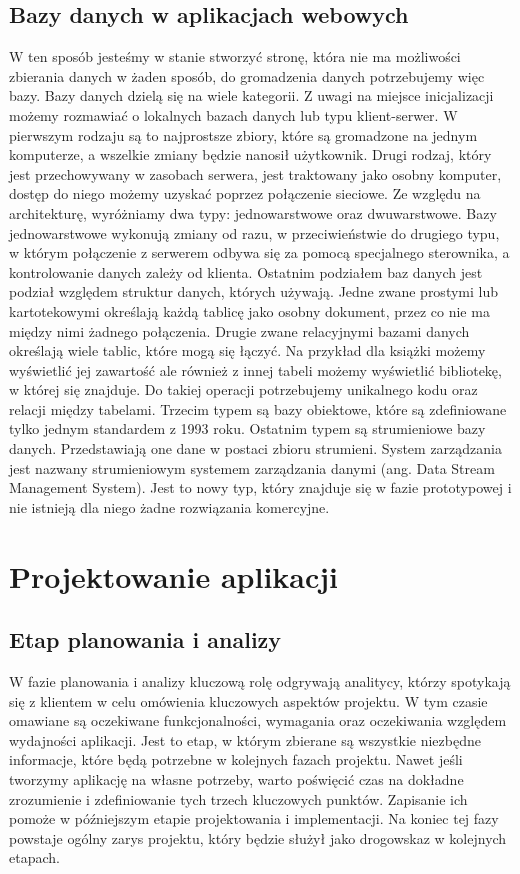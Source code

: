 \subsection{Bazy danych w aplikacjach webowych}

W ten sposób jesteśmy w stanie stworzyć stronę, która nie ma możliwości zbierania danych w żaden sposób, do gromadzenia danych potrzebujemy więc bazy. Bazy danych dzielą się na wiele kategorii. Z uwagi na miejsce inicjalizacji możemy rozmawiać o lokalnych bazach danych lub typu klient-serwer. W pierwszym rodzaju są to najprostsze zbiory, które są gromadzone na jednym komputerze, a wszelkie zmiany będzie nanosił użytkownik. Drugi rodzaj, który jest przechowywany w zasobach serwera, jest traktowany jako osobny komputer, dostęp do niego możemy uzyskać poprzez połączenie sieciowe. Ze względu na architekturę, wyróżniamy dwa typy: jednowarstwowe oraz dwuwarstwowe. Bazy jednowarstwowe wykonują zmiany od razu, w przeciwieństwie do drugiego typu, w którym połączenie z serwerem odbywa się za pomocą specjalnego sterownika, a kontrolowanie danych zależy od klienta. Ostatnim podziałem baz danych jest podział względem struktur danych, których używają. Jedne zwane prostymi lub kartotekowymi określają każdą tablicę jako osobny dokument, przez co nie ma między nimi żadnego połączenia. Drugie zwane relacyjnymi bazami danych określają wiele tablic, które mogą się łączyć. Na przykład dla książki możemy wyświetlić jej zawartość ale również z innej tabeli możemy wyświetlić bibliotekę, w której się znajduje. Do takiej operacji potrzebujemy unikalnego kodu oraz relacji między tabelami. Trzecim typem są bazy obiektowe, które są zdefiniowane tylko jednym standardem z 1993 roku. Ostatnim typem są strumieniowe bazy danych. Przedstawiają one dane w postaci zbioru strumieni. System zarządzania jest nazwany strumieniowym systemem zarządzania danymi (ang. Data Stream Management System). Jest to nowy typ, który znajduje się w fazie prototypowej i nie istnieją dla niego żadne rozwiązania komercyjne.

\section{Projektowanie aplikacji}
\subsection{Etap planowania i analizy}

W fazie planowania i analizy kluczową rolę odgrywają analitycy, którzy spotykają się z klientem w celu omówienia kluczowych aspektów projektu. W tym czasie omawiane są oczekiwane funkcjonalności, wymagania oraz oczekiwania względem wydajności aplikacji. Jest to etap, w którym zbierane są wszystkie niezbędne informacje, które będą potrzebne w kolejnych fazach projektu. Nawet jeśli tworzymy aplikację na własne potrzeby, warto poświęcić czas na dokładne zrozumienie i zdefiniowanie tych trzech kluczowych punktów. Zapisanie ich pomoże w późniejszym etapie projektowania i implementacji. Na koniec tej fazy powstaje ogólny zarys projektu, który będzie służył jako drogowskaz w kolejnych etapach.

